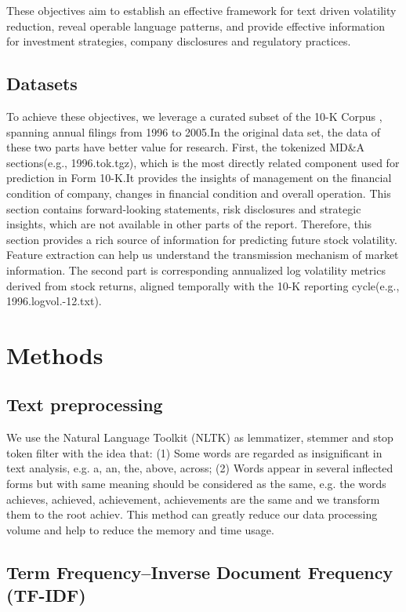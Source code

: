 \documentclass[11pt]{article}
\begin{document}
These objectives aim to establish an effective framework for text driven volatility reduction, reveal operable language patterns, and provide effective information for investment strategies, company disclosures and regulatory practices.

\subsection{Datasets}

To achieve these objectives, we leverage a curated subset of the 10-K Corpus \cite{Kogan2009} , spanning annual filings from 1996 to 2005.In the original data set, the data of these two parts have better value for research. First, the tokenized MD\&A sections(e.g., 1996.tok.tgz), which is the most directly related component used for prediction in Form 10-K.It provides the insights of management on the financial condition of company, changes in financial condition and overall operation. This section contains forward-looking statements, risk disclosures and strategic insights, which are not available in other parts of the report. Therefore, this section provides a rich source of information for predicting future stock volatility. Feature extraction can help us understand the transmission mechanism of market information. The second part is corresponding annualized log volatility metrics derived from stock returns, aligned temporally with the 10-K reporting cycle(e.g., 1996.logvol.-12.txt).

\section{Methods}

\subsection{Text preprocessing}

We use the Natural Language Toolkit (NLTK) \cite{nltk-py} as lemmatizer, stemmer and stop token filter with the idea that: (1) Some words are regarded as insignificant in text analysis, e.g. a, an, the, above, across; (2) Words appear in several inflected forms but with same meaning should be considered as the same, e.g. the words achieves, achieved, achievement, achievements are the same and we transform them to the root achiev. This method can greatly reduce our data processing volume and help to reduce the memory and time usage.

\subsection{Term Frequency–Inverse Document Frequency (TF-IDF)}
\end{document}
